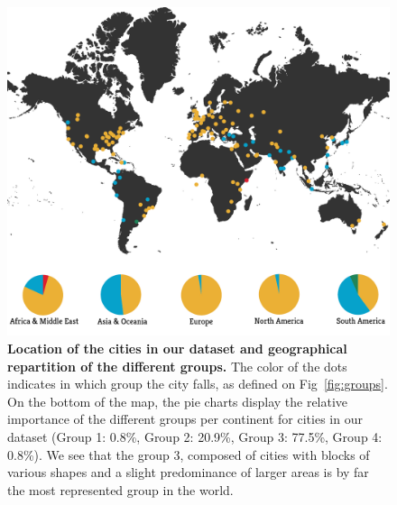 \begin{figure}
    \includegraphics[width=\textwidth]{./gfx/chapter-networks/combination.pdf}
    \caption{{\bf Location of the cities in our dataset and geographical repartition
    of the different groups.} The color of the dots indicates in which group the
    city falls, as defined on Fig~\ref{fig:groups}. On the bottom of the map, the
    pie charts display the relative importance of the different groups per continent
    for cities in our dataset (Group 1: 0.8\%, Group 2: 20.9\%, Group 3: 77.5\%,
    Group 4: 0.8\%). We see that the group $3$, composed of cities with blocks of
    various shapes and a slight predominance of larger areas is by far the most
    represented group in the world. \label{fig:world_map}} 
\end{figure}

